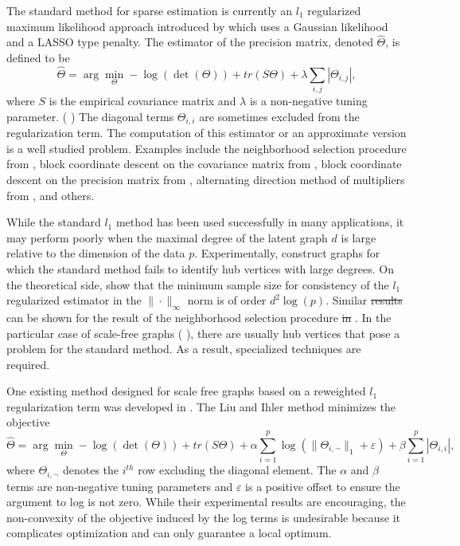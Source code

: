 \documentclass{uwstat572}
\newcommand{\vmdel}[1]{\sout{#1}}
\newcommand{\vmadd}[1]{\textbf{\color{red}{#1}}}
\newcommand{\vmcomment}[1]{({\color{blue}{VM's comment:}} \textbf{\color{blue}{#1}})}
\begin{document}
The standard method for sparse estimation is currently an $l_1$ regularized maximum likelihood approach\vmadd{,} introduced by \cite{Yuan2007}\vmadd{,} which uses a Gaussian likelihood and a LASSO type penalty.  The estimator of the precision matrix, denoted $\widehat{\Theta}$, is defined to be
\begin{equation}
    \widehat{\Theta} = \arg\min_{\Theta} -\log( \det( \Theta)) + tr(S \Theta) + \lambda \sum_{i, j} |\Theta_{i,j}|,
\end{equation}
where $S$ is the empirical covariance matrix and $\lambda$ is a non-negative tuning parameter. \vmcomment{Vectors and matrices need to be bolded.} The diagonal terms $\Theta_{i,i}$ are sometimes excluded from the regularization term. The computation of this estimator or an approximate version \vmadd{of it} is a well studied problem.  Examples include the neighborhood selection procedure from \cite{meinshausen2006}, block coordinate descent on the covariance matrix from \cite{Banerjee2008}, block coordinate descent on the precision matrix from \cite{Friedman2008}, alternating direction method of multipliers from \cite{Boyd2011}, and others.

While the standard $l_1$ method has been used successfully in many applications, it may perform poorly when the maximal degree of the latent graph $d$ is large relative to the dimension of the data $p$. Experimentally, \cite{Schaefer2005} construct graphs for which the standard method fails to identify hub vertices with large degrees. On the theoretical side, \cite{ravikumar2011} show that the minimum sample size for consistency of the $l_1$ regularized estimator in the $\| \cdot \|_{\infty}$ norm is of order $d^2 \log(p)$\vmadd{, which is bad because ...}. 
Similar \vmdel{results} \vmadd{properties} can be shown for the result of the neighborhood selection procedure \vmdel{in} \vmadd{by} \citet{meinshausen2006}.  
In the particular case of scale-free graphs \vmcomment{scale-free is not defined}, there are usually hub vertices that pose a problem for the standard method.  As a result, specialized techniques are required.

One existing method designed for scale free graphs based on a reweighted $l_1$ regularization term was developed in \cite{liu11c}.  The Liu and Ihler method minimizes the objective
\begin{equation}
    \widehat{\Theta} = \arg\min_{\Theta}  -\log( \det( \Theta)) + tr(S \Theta) + \alpha \sum_{i=1}^p \log( \| \Theta_{i,\neg}\|_1 + \varepsilon ) + \beta \sum_{i=1}^p |\Theta_{i,i}|,
\end{equation}
where $\Theta_{i,\neg}$ denotes the $i^{th}$ row excluding the diagonal element.  The $\alpha$ and $\beta$ terms are non-negative tuning parameters and $\varepsilon$ is a positive offset to ensure the argument to log is not zero. While their experimental results are encouraging, the non-convexity of the objective induced by the log terms is undesirable because it complicates optimization and can only guarantee a local optimum.
\end{document}
